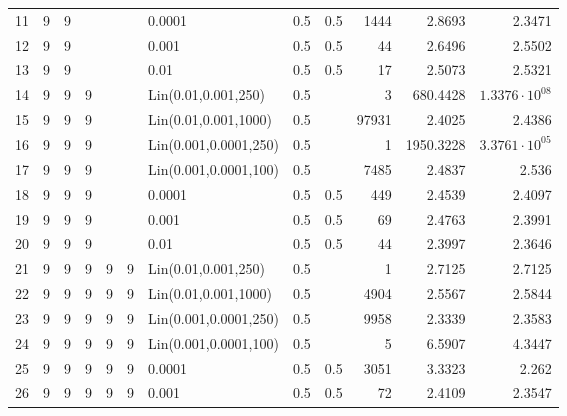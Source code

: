 \begin{longtable}{lrrrrrlrrrrr}
  11 &       9 & 9 &   &   &   &                0.0001 &  0.5 &    0.5 &    1444 &                 2.8693 &                2.3471 \\
  12 &       9 & 9 &   &   &   &                 0.001 &  0.5 &    0.5 &      44 &                 2.6496 &                2.5502 \\
  13 &       9 & 9 &   &   &   &                  0.01 &  0.5 &    0.5 &      17 &                 2.5073 &                2.5321 \\
  14 &       9 & 9 & 9 &   &   &   Lin(0.01,0.001,250) &  0.5 &        &       3 &               680.4428 & $1.3376\cdot 10^{08}$ \\
  15 &       9 & 9 & 9 &   &   &  Lin(0.01,0.001,1000) &  0.5 &        &   97931 &                 2.4025 &                2.4386 \\
  16 &       9 & 9 & 9 &   &   & Lin(0.001,0.0001,250) &  0.5 &        &       1 &              1950.3228 & $3.3761\cdot 10^{05}$ \\
  17 &       9 & 9 & 9 &   &   & Lin(0.001,0.0001,100) &  0.5 &        &    7485 &                 2.4837 &                 2.536 \\
  18 &       9 & 9 & 9 &   &   &                0.0001 &  0.5 &    0.5 &     449 &                 2.4539 &                2.4097 \\
  19 &       9 & 9 & 9 &   &   &                 0.001 &  0.5 &    0.5 &      69 &                 2.4763 &                2.3991 \\
  20 &       9 & 9 & 9 &   &   &                  0.01 &  0.5 &    0.5 &      44 &                 2.3997 &                2.3646 \\
  21 &       9 & 9 & 9 & 9 & 9 &   Lin(0.01,0.001,250) &  0.5 &        &       1 &                 2.7125 &                2.7125 \\
  22 &       9 & 9 & 9 & 9 & 9 &  Lin(0.01,0.001,1000) &  0.5 &        &    4904 &                 2.5567 &                2.5844 \\
  23 &       9 & 9 & 9 & 9 & 9 & Lin(0.001,0.0001,250) &  0.5 &        &    9958 &                 2.3339 &                2.3583 \\
  24 &       9 & 9 & 9 & 9 & 9 & Lin(0.001,0.0001,100) &  0.5 &        &       5 &                 6.5907 &                4.3447 \\
  25 &       9 & 9 & 9 & 9 & 9 &                0.0001 &  0.5 &    0.5 &    3051 &                 3.3323 &                 2.262 \\
  26 &       9 & 9 & 9 & 9 & 9 &                 0.001 &  0.5 &    0.5 &      72 &                 2.4109 &                2.3547 \\

\end{longtable}
